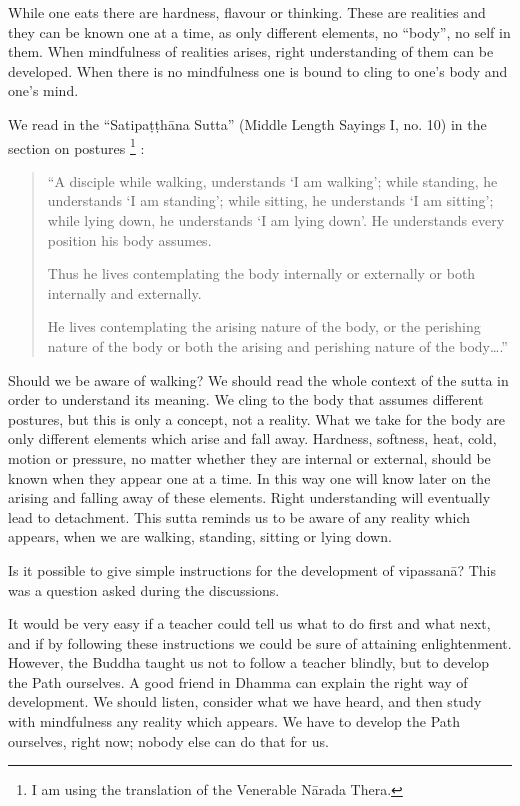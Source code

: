 While one eats there are hardness, flavour or thinking. These are
realities and they can be known one at a time, as only different
elements, no ``body'', no self in them. When mindfulness of realities
arises, right understanding of them can be developed. When there is no
mindfulness one is bound to cling to one's body and one's mind.

We read in the ``Satipaṭṭhāna Sutta'' (Middle Length Sayings I, no. 10)
in the section on postures
\footnote{I am using the translation of
the Venerable Nārada Thera.}
:

\begin{quote}

``A disciple while walking, understands `I am walking'; while standing,
he understands `I am standing'; while sitting, he understands `I am
sitting'; while lying down, he understands `I am lying down'. He
understands every position his body assumes.

Thus he lives contemplating the body internally or externally or both
internally and externally.

He lives contemplating the arising nature of the body, or the perishing
nature of the body or both the arising and perishing nature of the
body\ldots{}.''

\end{quote}

Should we be aware of walking? We should read the whole context of the
sutta in order to understand its meaning. We cling to the body that
assumes different postures, but this is only a concept, not a reality.
What we take for the body are only different elements which arise and
fall away. Hardness, softness, heat, cold, motion or pressure, no matter
whether they are internal or external, should be known when they appear
one at a time. In this way one will know later on the arising and
falling away of these elements. Right understanding will eventually lead
to detachment. This sutta reminds us to be aware of any reality which
appears, when we are walking, standing, sitting or lying down.

Is it possible to give simple instructions for the development of
vipassanā? This was a question asked during the discussions.

It would be very easy if a teacher could tell us what to do first and
what next, and if by following these instructions we could be sure of
attaining enlightenment. However, the Buddha taught us not to follow a
teacher blindly, but to develop the Path ourselves. A good friend in
Dhamma can explain the right way of development. We should listen,
consider what we have heard, and then study with mindfulness any reality
which appears. We have to develop the Path ourselves, right now; nobody
else can do that for us.

